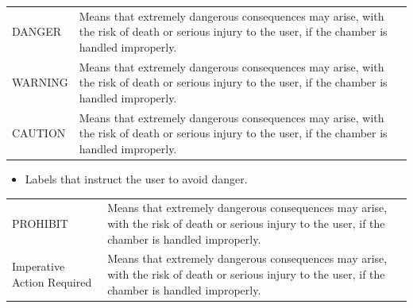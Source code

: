 \begin{longtable}[]{@{}ll@{}}
\toprule
\endhead
\begin{minipage}[t]{0.28\columnwidth}\raggedright
DANGER\strut
\end{minipage} & \begin{minipage}[t]{0.66\columnwidth}\raggedright
Means that extremely dangerous consequences may arise, with the risk of
death or serious injury to the user, if the chamber is handled
improperly.\strut
\end{minipage}\tabularnewline
\begin{minipage}[t]{0.28\columnwidth}\raggedright
WARNING\strut
\end{minipage} & \begin{minipage}[t]{0.66\columnwidth}\raggedright
Means that extremely dangerous consequences may arise, with the risk of
death or serious injury to the user, if the chamber is handled
improperly.\strut
\end{minipage}\tabularnewline
\begin{minipage}[t]{0.28\columnwidth}\raggedright
CAUTION\strut
\end{minipage} & \begin{minipage}[t]{0.66\columnwidth}\raggedright
Means that extremely dangerous consequences may arise, with the risk of
death or serious injury to the user, if the chamber is handled
improperly.\strut
\end{minipage}\tabularnewline
\bottomrule
\end{longtable}

\begin{itemize}
\tightlist
\item
  Labels that instruct the user to avoid danger.
\end{itemize}

\begin{longtable}[]{@{}ll@{}}
\toprule
\endhead
\begin{minipage}[t]{0.28\columnwidth}\raggedright
PROHIBIT\strut
\end{minipage} & \begin{minipage}[t]{0.66\columnwidth}\raggedright
Means that extremely dangerous consequences may arise, with the risk of
death or serious injury to the user, if the chamber is handled
improperly.\strut
\end{minipage}\tabularnewline
\begin{minipage}[t]{0.28\columnwidth}\raggedright
Imperative Action Required\strut
\end{minipage} & \begin{minipage}[t]{0.66\columnwidth}\raggedright
Means that extremely dangerous consequences may arise, with the risk of
death or serious injury to the user, if the chamber is handled
improperly.\strut
\end{minipage}\tabularnewline
\bottomrule
\end{longtable}

